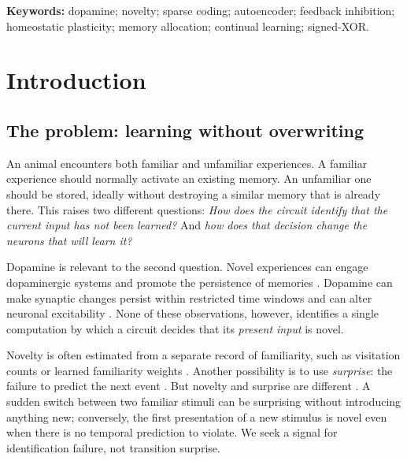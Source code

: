 \documentclass[11pt,a4paper]{article}
\begin{document}
\noindent\textbf{Keywords:} dopamine; novelty; sparse coding; autoencoder; feedback inhibition; homeostatic plasticity; memory allocation; continual learning; signed-XOR.

\section{Introduction}

\subsection*{The problem: learning without overwriting}
An animal encounters both familiar and unfamiliar experiences. A familiar experience should normally activate an existing memory. An unfamiliar one should be stored, ideally without destroying a similar memory that is already there. This raises two different questions: \emph{How does the circuit identify that the current input has not been learned?} And \emph{how does that decision change the neurons that will learn it?}

Dopamine is relevant to the second question. Novel experiences can engage dopaminergic systems and promote the persistence of memories \citep{lisman2005,duszkiewicz2019,moncada2007,takeuchi2016}. Dopamine can make synaptic changes persist within restricted time windows \citep{shindou2019,yagishita2014} and can alter neuronal excitability \citep{durstewitz2008,kutter2026,naude2024}. None of these observations, however, identifies a single computation by which a circuit decides that its \emph{present input} is novel.

Novelty is often estimated from a separate record of familiarity, such as visitation counts or learned familiarity weights \citep{kakade2002,bogacz2003,dasgupta2018}. Another possibility is to use \emph{surprise}: the failure to predict the next event \citep{modirshanechi2022}. But novelty and surprise are different \citep{xu2021}. A sudden switch between two familiar stimuli can be surprising without introducing anything new; conversely, the first presentation of a new stimulus is novel even when there is no temporal prediction to violate. We seek a signal for identification failure, not transition surprise.
\end{document}
